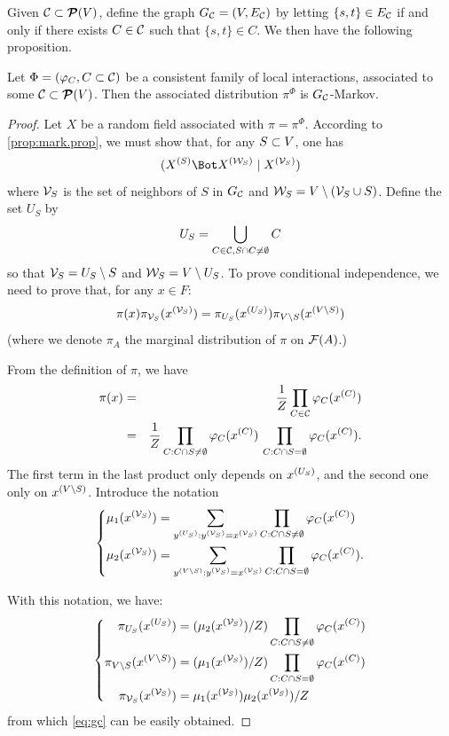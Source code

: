 Given  $\mathcal C \subset {\bm{\mathcal P}({V})}$, define the  graph
$G_{{\mathcal C}} = (V, E_{{\mathcal C}})$ by letting $\{s,t\}\in E_{\mathcal C}$ if and only if
there exists $C\in {\mathcal C}$ such that $\{s,t\}\in C$. We then have the
following proposition.
\begin{proposition}
\label{prop:gc}
Let $\Phi = (\varphi_C, C\subset {\mathcal C})$ be a consistent family of local
interactions, associated to some ${\mathcal C}\subset {\bm{\mathcal P}({V})}$. Then the
associated distribution $\pi^\Phi$ is $G_{\mathcal C}$-Markov.
\end{proposition}
\begin{proof}
Let $X$ be a random field associated with $\pi = \pi^\Phi$.
According to  \cref{prop:mark.prop}, we must show that, for
any $S\subset V$, one has
\[
\cind{\pe X S}{\pe X {\CW_S}}{\pe X {\mathcal V_S}}
\]
where ${\mathcal V}_S$ is the set of neighbors of $S$ in $G_{{\mathcal C}}$ and ${\mathcal W}_S
= V\setminus ({\mathcal V}_S \cup S)$. Define the set $U_S$ by
\[
U_S = \bigcup_{C\in {\mathcal C}, S\cap C\neq \emptyset} C
\]
so that ${\mathcal V}_S = U_S \setminus S$ and ${\mathcal W}_S = V \setminus U_S$. To prove
conditional independence, we need to prove that, for any $x\in F$:
\begin{equation}
\label{eq:gc}
\pi(x)\pi_{{\mathcal V}_S}(x^{({\mathcal V}_S)}) = \pi_{U_S}(x^{(U_S)})\pi_{V\setminus S}(x^{(V\setminus S)})
\end{equation}
(where we denote $\pi_A$ the marginal distribution of $\pi$ on ${\mathcal F}(A)$.)

From the
definition of $\pi$, we have
\begin{eqnarray*}
\pi(x) &=& \frac{1}{Z} \prod_{C\in {\mathcal C}} \varphi_C(x^{(C)})\\
&=&\frac{1}{Z} \prod_{C:C\cap S\neq\emptyset} \varphi_C(x^{(C)}) \, \prod_{C:C\cap
  S=\emptyset} \varphi_C(x^{(C)}).
\end{eqnarray*}
The first term in the last product only depends on $x^{(U_S)}$, and the second one only on
$x^{(V\setminus S)}$. 
Introduce the notation
\[
\left\{
\begin{aligned}
\mu_1(x^{({\mathcal V}_S)}) &= \sum_{y^{(U_S)}: y^{({\mathcal V}_S)} = x^{({\mathcal V}_S)}} \prod_{C:C\cap
  S\neq\emptyset} \varphi_C(x^{(C)}) \\ 
\mu_2(x^{({\mathcal V}_S)}) &= \sum_{y^{(V\setminus S)}: y^{({\mathcal V}_S)} = x^{({\mathcal V}_S)}} \prod_{C:C\cap
  S=\emptyset} \varphi_C(x^{(C)}). 
\end{aligned}
\right.
\] 

With this notation, we have:
\[
\left\{
\begin{aligned}
\pi_{U_S}(x^{(U_S)}) &= (\mu_2(x^{({\mathcal V}_S)})/Z) \prod_{C:C\cap S\neq\emptyset} \varphi_C(x^{(C)}) \\
\pi_{V\setminus S}(x^{(V\setminus S)}) &= (\mu_1(x^{({\mathcal V}_S)})/Z) \prod_{C:C\cap S =
  \emptyset} \varphi_C(x^{(C)}) \\
\pi_{{\mathcal V}_S}(x^{({\mathcal V}_S)}) &= \mu_1(x^{({\mathcal V}_S)}) \mu_2(x^{({\mathcal V}_S)})/Z
\end{aligned}
\right.
\]
from which \cref{eq:gc} can be easily obtained.
\end{proof}

